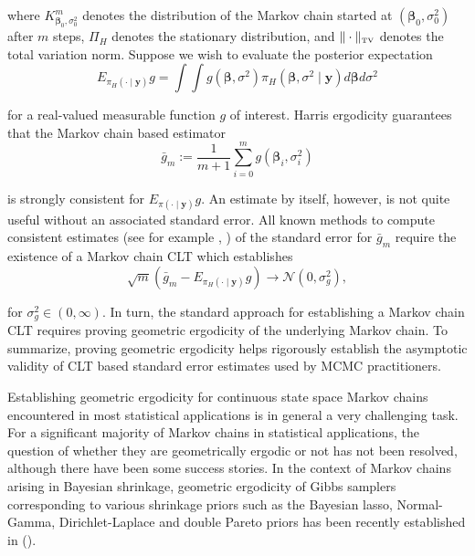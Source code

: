 \documentclass[noinfoline,11pt]{imsart}
\numberwithin{equation}{section}
\theoremstyle{plain}
\newcommand{\y}{\mathbf{y}}
\newcommand{\bb}{\boldsymbol{\beta}}
\begin{document}
\noindent
where $K_{\bb_0, \sigma^2_0}^m$ denotes the distribution of the Markov chain started at $(\bb_0, \sigma^2_0)$ after $m$ steps, $\Pi_H$ denotes the stationary distribution, and $\|\cdot\|_{\mbox{\tiny{TV}}}$ denotes the total variation norm. Suppose we wish to evaluate the posterior expectation 
$$
E_{\pi_H (\cdot \mid \y)} g = \int \int g\left(\bb, \sigma^2\right) \pi_H \left(\bb, \sigma^2 
\mid \y\right) d \bb d \sigma^2 
$$

\noindent
for a real-valued measurable function $g$ of interest. Harris ergodicity guarantees that the Markov chain based estimator 
$$
\bar{g}_m := \frac{1}{m+1} \sum_{i=0}^m g\left(\bb_i, \sigma^2_i\right) 
$$

\noindent
is strongly consistent for $E_{\pi (\cdot \mid \y)} g$. An estimate by itself, however, is not quite useful without an associated standard error. All known methods to compute consistent estimates (see for example \cite{flegal2010}, \cite{10.2307/25734098}) of the standard error for $\bar{g}_m$ require the existence of a Markov chain CLT which establishes 
$$
\sqrt{m} \left( \bar{g}_m - E_{\pi_H (\cdot \mid \y)} g \right) \rightarrow \mathcal{N}(0, \sigma_g^2), 
$$

\noindent
for $\sigma_g^2 \in (0, \infty)$. In turn, the standard approach for 
establishing a Markov chain CLT requires proving geometric ergodicity of the underlying Markov chain. To summarize, proving geometric ergodicity helps 
rigorously establish the asymptotic validity of
CLT based standard error estimates used by MCMC practitioners. 

Establishing geometric ergodicity for continuous state space Markov chains encountered in most statistical applications is in general a very challenging task. For a significant majority of Markov chains in statistical applications, the question of whether they are geometrically ergodic or not has not been resolved, although there have been some success stories. In the context of Markov chains arising in Bayesian shrinkage, geometric ergodicity of Gibbs samplers corresponding to various shrinkage priors such as the Bayesian lasso, Normal-Gamma, Dirichlet-Laplace and double Pareto priors has been recently established in (\cite{khare2013, 
RePEc:bla:scjsta:v:44:y:2017:i:2:p:307-323, pal2014}). 
\end{document}
